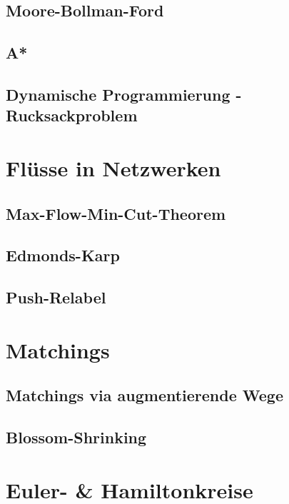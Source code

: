 \documentclass[10pt,a4paper,landscape]{article}
\begin{document}
\begin{multicols*}{2}
            \subsection{ Moore-Bollman-Ford }

            \subsection{ A* }

            \subsection{ Dynamische Programmierung - Rucksackproblem }

        \section{ Flüsse in Netzwerken }
            \subsection{ Max-Flow-Min-Cut-Theorem }\subsection{  }

            \subsection{ Edmonds-Karp }

            \subsection{ Push-Relabel }


        \section{ Matchings }
            \subsection{ Matchings via augmentierende Wege }

            \subsection{ Blossom-Shrinking }


        \section{ Euler- \& Hamiltonkreise }

\end{multicols*}
\end{document}
